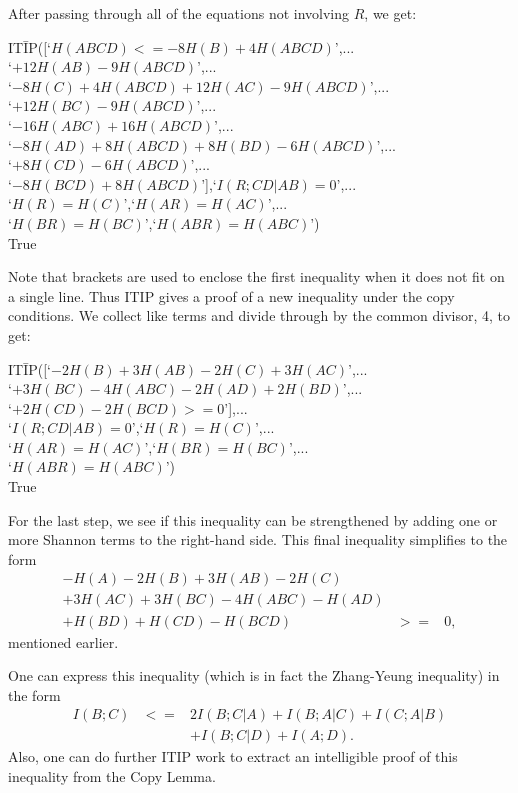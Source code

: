 \documentclass[10pt,journal]{IEEEtran}
\begin{document}
After passing through all of the equations not involving $R$,
we get:
\begin{tabbing}
IT\=IP([`$H(ABCD)<=-8H(B)+4H(ABCD)$',...\\
    \>`$+12H(AB)-9H(ABCD)$',...\\
    \> `$-8H(C)+4H(ABCD)+12H(AC)-9H(ABCD)$',...\\
    \>`$+12H(BC)-9H(ABCD)$',...\\
      \>`$-16H(ABC)+16H(ABCD)$',...\\
      \>`$-8H(AD)+8H(ABCD)+8H(BD)-6H(ABCD)$',...\\
      \>`$+8H(CD)-6H(ABCD)$',...\\
      \>`$-8H(BCD)+8H(ABCD)$'],`$I(R;CD|AB)=0$',...\\
      \>`$H(R)=H(C)$',`$H(AR)=H(AC)$',...\\
      \>`$H(BR)=H(BC)$',`$H(ABR)=H(ABC)$')\\
   True
\end{tabbing}

Note that brackets are used to enclose the first inequality when it does
not fit on a single line.
Thus ITIP gives a proof of a new inequality under the copy conditions.
We collect like terms and divide through by the common divisor, 4, to get:
\begin{tabbing}
IT\=IP([`$-2H(B)+3H(AB)-2H(C)+3H(AC)$',...\\
    \>`$+3H(BC)-4H(ABC)-2H(AD)+2H(BD)$',...\\
    \>`$+2H(CD)-2H(BCD)>=0$'],...\\
    \>`$I(R;CD|AB)=0$',`$H(R)=H(C)$',...\\
    \>`$H(AR)=H(AC)$',`$H(BR)=H(BC)$',...\\
    \>`$H(ABR)=H(ABC)$')
\\
   True
\end{tabbing}

For the last step, we see if this inequality can be strengthened by adding
one or more Shannon terms to the right-hand side.
This final inequality simplifies to the form
\begin{eqnarray*}
   -H(A)-2H(B)+3H(AB)-2H(C)&&\\
   +3H(AC)+3H(BC)-4H(ABC)-H(AD)&&\\
   +H(BD)+H(CD)-H(BCD) &>=& 0,
\end{eqnarray*}
mentioned earlier.

One can express this inequality (which is in fact the Zhang-Yeung inequality)
in the form
 \begin{eqnarray*}
   I(B;C) &<=& 2I(B;C|A)+I(B;A|C)+I(C;A|B)\\
   &&+I(B;C|D)+I(A;D).
   \end{eqnarray*}
Also, one can do further ITIP work to extract an intelligible proof of
this inequality from the Copy Lemma.
\end{document}
